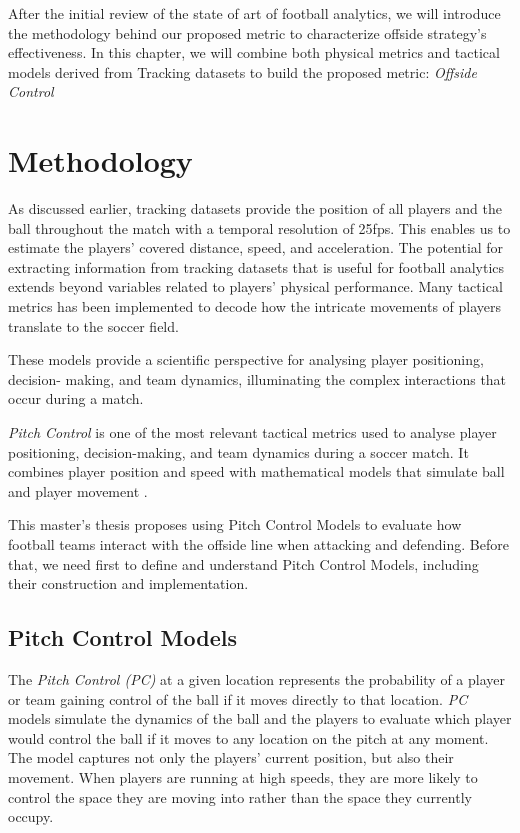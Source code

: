 \documentclass[
  twoside,nohyper]{book}
\begin{document}
After the initial review of the state of art of football analytics, we will introduce the methodology behind our proposed metric to characterize offside strategy's effectiveness. In this chapter, we will combine both physical metrics and tactical models derived from Tracking datasets to build the proposed metric: \emph{Offside Control}

\chapter{Methodology}\label{methodology}

As discussed earlier, tracking datasets provide the position of all players and the ball throughout the match with a temporal resolution of 25fps. This enables us to estimate the players' covered distance, speed, and acceleration. The potential for extracting information from tracking datasets that is useful for football analytics extends beyond variables related to players' physical performance. Many tactical metrics has been implemented to decode how the intricate movements of players translate to the soccer field.

These models provide a scientific perspective for analysing player positioning, decision-
making, and team dynamics, illuminating the complex interactions that occur during a
match.

\emph{Pitch Control} is one of the most relevant tactical metrics used to analyse player positioning, decision-making, and team dynamics during a soccer match. It combines player position and speed with mathematical models that simulate ball and player movement \citep{Spearman}.

This master's thesis proposes using Pitch Control Models to evaluate how football teams interact with the offside line when attacking and defending. Before that, we need first to define and understand Pitch Control Models, including their construction and implementation.

\section{Pitch Control Models}\label{pitch-control-models}

The \emph{Pitch Control (PC)} at a given location represents the probability of a player or team gaining control of the ball if it moves directly to that location. \emph{PC} models simulate the dynamics of the ball and the players to evaluate which player would control the ball if it moves to any location on the pitch at any moment.
The model captures not only the players' current position, but also their movement. When players are running at high speeds, they are more likely to control
the space they are moving into rather than the space they currently occupy.
\end{document}
